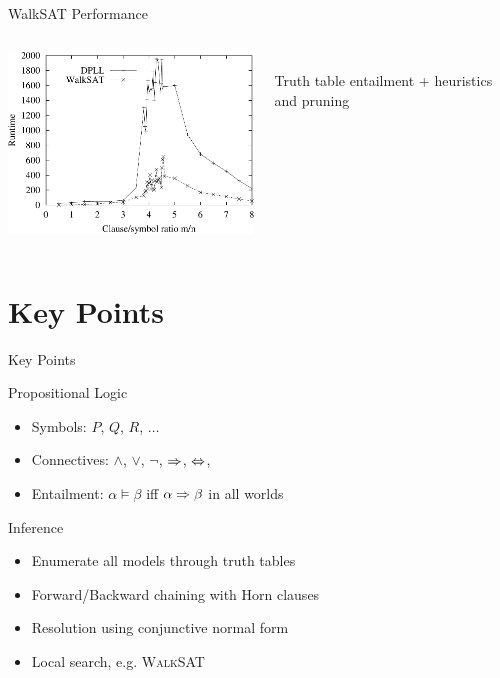 \documentclass[14pt]{beamer}
\begin{document}
\begin{frame}{WalkSAT Performance}
	\begin{columns}
		\begin{column}{3.2in}
			\includegraphics[width=3.2in]{random-3sat-performance}
		\end{column}
		\begin{column}{1in}
			 \\
			Truth table entailment + heuristics and pruning
		\end{column}
	\end{columns}
\end{frame}

\part{Key Points}
\begin{frame}{Key Points}
	\begin{block}{Propositional Logic}
		\begin{itemize}
			\item Symbols: $P$, $Q$, $R$, $\ldots$
			\item Connectives: $\land$, $\lor$, $\lnot$, $\Rightarrow$, $\Leftrightarrow$, 
			\item Entailment: $\alpha \models \beta$ iff $\alpha \Rightarrow \beta$ in all worlds
		\end{itemize}
	\end{block}
	\begin{block}{Inference}
		\begin{itemize}
			\item Enumerate all models through truth tables
			\item Forward/Backward chaining with Horn clauses
			\item Resolution using conjunctive normal form
			\item Local search, e.g. \textsc{WalkSAT}
		\end{itemize}
	\end{block}
\end{frame}
\end{document}
